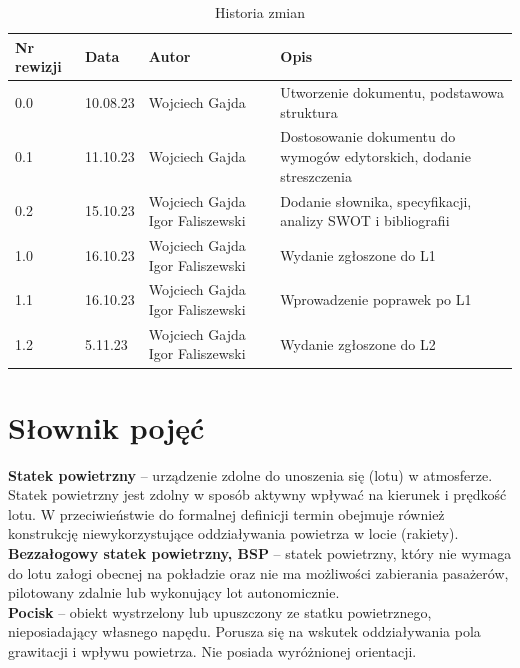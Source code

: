 \documentclass[15pt]{sprawozdanie}
\begin{document}
\renewcommand{\arraystretch}{1.5}
\begin{table}[!h]
\centering
\begin{tabular}{|m{}|m{}|m{}|m{}|} 
\hline
\rowcolor{Gray}
Nr rewizji & Data & Autor & Opis \\
 \hline
  0.0 & 10.08.23 & Wojciech Gajda & Utworzenie dokumentu, podstawowa struktura \\ 
\hline
  0.1 & 11.10.23 & Wojciech Gajda & Dostosowanie dokumentu do wymogów edytorskich, dodanie streszczenia \\ 
\hline
  0.2 & 15.10.23 & Wojciech Gajda \newline Igor Faliszewski & Dodanie  słownika, specyfikacji, analizy SWOT i bibliografii \\ 
\hline
  1.0 & 16.10.23 & Wojciech Gajda \newline Igor Faliszewski & Wydanie zgłoszone do L1 \\
\hline
  1.1 & 16.10.23 & Wojciech Gajda \newline Igor Faliszewski & Wprowadzenie poprawek po L1 \\
\hline
  1.2 & 5.11.23 & Wojciech Gajda \newline Igor Faliszewski & Wydanie zgłoszone do L2 \\
\hline
\end{tabular}
\caption{Historia zmian}
\label{changelog}
\end{table}

\newpage

\section{Słownik pojęć}

\textbf{Statek powietrzny} -- urządzenie zdolne do unoszenia się (lotu) w atmosferze. Statek powietrzny jest zdolny w sposób aktywny wpływać na kierunek i prędkość lotu. W przeciwieństwie do formalnej definicji termin obejmuje również konstrukcję niewykorzystujące oddziaływania powietrza w locie (rakiety).\\

\textbf{Bezzałogowy statek powietrzny, BSP} -- statek powietrzny, który nie wymaga do lotu załogi obecnej na pokładzie oraz nie ma możliwości zabierania pasażerów, pilotowany zdalnie lub wykonujący lot autonomicznie.\\ 

\textbf{Pocisk} -- obiekt wystrzelony lub upuszczony ze statku powietrznego, nieposiadający własnego napędu. Porusza się na wskutek oddziaływania pola grawitacji i wpływu powietrza. Nie posiada wyróżnionej orientacji.\\
\end{document}

